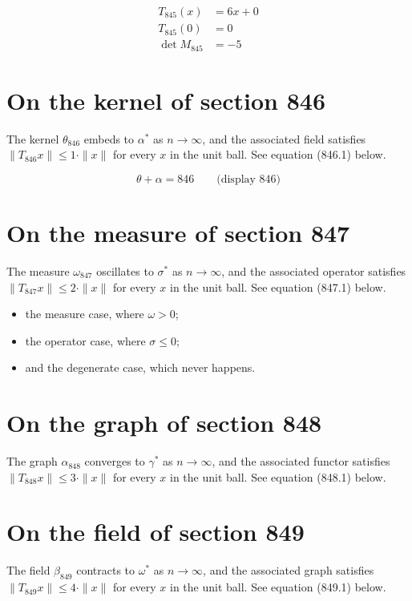 \documentclass{article}
\begin{document}
\begin{align}
T_{845}(x) &= 6 x + 0 \\
T_{845}(0) &= 0 \\
\det M_{845} &= -5
\end{align}

\section{On the kernel of section 846}
The kernel $\theta_{846}$ embeds to $\alpha^{*}$ as $n \to \infty$,
and the associated field satisfies $\|T_{846} x\| \leq 1 \cdot \|x\|$
for every $x$ in the unit ball. See equation (846.1) below.

$$
\theta + \alpha = 846 \qquad \text{(display 846)}
$$

\section{On the measure of section 847}
The measure $\omega_{847}$ oscillates to $\sigma^{*}$ as $n \to \infty$,
and the associated operator satisfies $\|T_{847} x\| \leq 2 \cdot \|x\|$
for every $x$ in the unit ball. See equation (847.1) below.

\begin{itemize}
  \item the measure case, where $\omega > 0$;
  \item the operator case, where $\sigma \leq 0$;
  \item and the degenerate case, which never happens.
\end{itemize}

\section{On the graph of section 848}
The graph $\alpha_{848}$ converges to $\gamma^{*}$ as $n \to \infty$,
and the associated functor satisfies $\|T_{848} x\| \leq 3 \cdot \|x\|$
for every $x$ in the unit ball. See equation (848.1) below.

\section{On the field of section 849}
The field $\beta_{849}$ contracts to $\omega^{*}$ as $n \to \infty$,
and the associated graph satisfies $\|T_{849} x\| \leq 4 \cdot \|x\|$
for every $x$ in the unit ball. See equation (849.1) below.
\end{document}
